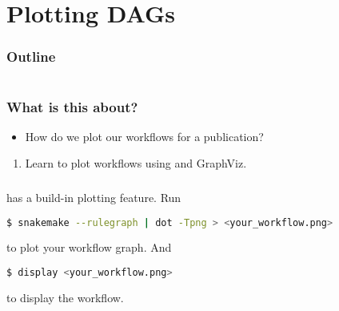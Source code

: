 \section{Plotting DAGs}

\begin{frame}
    \frametitle{Outline}
    \begin{columns}[t]
        \begin{column}{.5\textwidth}
            \tableofcontents[sections={1-7},currentsection]
        \end{column}
        \begin{column}{.5\textwidth}
            \tableofcontents[sections={8-15},currentsection]
        \end{column}
    \end{columns}
\end{frame}

\begin{frame}
  \frametitle{What is this about?}
   \begin{question}[Questions]
   	 \begin{itemize}
       \item How do we plot our workflows for a publication?
     \end{itemize}
   \end{question}
   \begin{docs}[Objectives]
   	  \begin{enumerate} 
                      \item Learn to plot workflows using \Snakemake{} and GraphViz.
      \end{enumerate}
   \end{docs}
\end{frame}

\begin{frame}[fragile]
  \frametitle{}
  \Snakemake{} has a build-in plotting feature. Run 
  \begin{lstlisting}[language=Bash, style=Shell]
$ snakemake --rulegraph | dot -Tpng > <your_workflow.png>
  \end{lstlisting}
  to plot your workflow graph. And
  \begin{lstlisting}[language=Bash, style=Shell]
$ display <your_workflow.png>
  \end{lstlisting}
  to display the workflow.
\end{frame}

